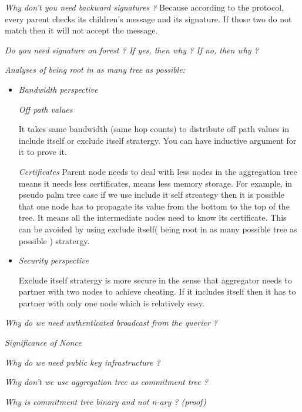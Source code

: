 \textit{Why don't you need backward signatures ?} Because according to the protocol, every parent checks its children's message and its signature. If those two do not match then it will not accept the message.

\textit{Do you need signature on forest ? If yes, then why ? If no, then why ?}

\textit{Analyses of being root in as many tree as possible:}
	
	\begin{itemize}
		\item \textit{Bandwidth perspective}
	
			\textit{Off path values}
				
				It takes same bandwidth (same hop counts) to distribute off path values in include itself or exclude itself stratergy. You can have inductive argument for it to prove it.

			\textit{Certificates}
				Parent node needs to deal with less nodes in the aggregation tree means it needs less certificates, means less memory storage. For example, in pseudo palm tree case if we use include it self streategy then it is possible that one node has to propagate its value from the bottom to the top of the tree. It means all the intermediate nodes need to know its certificate. This can be avoided by using exclude itself( being root in as many possible tree as possible ) stratergy.

		\item \textit{Security perspective}

				Exclude itself stratergy is more secure in the sense that aggregator needs to partner with two nodes to achieve cheating. If it includes itself then it has to partner with only one node which is relatively easy.

	\end{itemize}


\textit{Why do we need authenticated broadcast from the querier ?}

\textit{Significance of Nonce}

\textit{Why do we need public key infrastructure ?}

\textit{Why don't we use aggregation tree as commitment tree ?}

\textit{Why is commitment tree binary and not n-ary ? (proof)}

